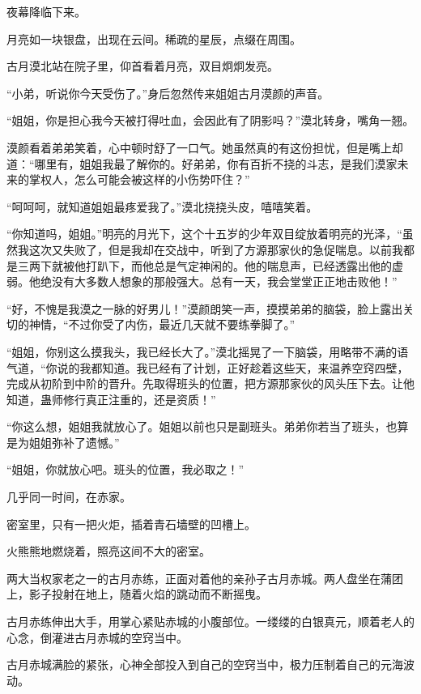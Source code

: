 
\begin{this_body}

夜幕降临下来。

月亮如一块银盘，出现在云间。稀疏的星辰，点缀在周围。

古月漠北站在院子里，仰首看着月亮，双目炯炯发亮。

“小弟，听说你今天受伤了。”身后忽然传来姐姐古月漠颜的声音。

“姐姐，你是担心我今天被打得吐血，会因此有了阴影吗？”漠北转身，嘴角一翘。

漠颜看着弟弟笑着，心中顿时舒了一口气。她虽然真的有这份担忧，但是嘴上却道：“哪里有，姐姐我最了解你的。好弟弟，你有百折不挠的斗志，是我们漠家未来的掌权人，怎么可能会被这样的小伤势吓住？”

“呵呵呵，就知道姐姐最疼爱我了。”漠北挠挠头皮，嘻嘻笑着。

“你知道吗，姐姐。”明亮的月光下，这个十五岁的少年双目绽放着明亮的光泽，“虽然我这次又失败了，但是我却在交战中，听到了方源那家伙的急促喘息。以前我都是三两下就被他打趴下，而他总是气定神闲的。他的喘息声，已经透露出他的虚弱。他绝没有大多数人想象的那般强大。总有一天，我会堂堂正正地击败他！”

“好，不愧是我漠之一脉的好男儿！”漠颜朗笑一声，摸摸弟弟的脑袋，脸上露出关切的神情，“不过你受了内伤，最近几天就不要练拳脚了。”

“姐姐，你别这么摸我头，我已经长大了。”漠北摇晃了一下脑袋，用略带不满的语气道，“你说的我都知道。我已经有了计划，正好趁着这些天，来温养空窍四壁，完成从初阶到中阶的晋升。先取得班头的位置，把方源那家伙的风头压下去。让他知道，蛊师修行真正注重的，还是资质！”

“你这么想，姐姐我就放心了。姐姐以前也只是副班头。弟弟你若当了班头，也算是为姐姐弥补了遗憾。”

“姐姐，你就放心吧。班头的位置，我必取之！”

几乎同一时间，在赤家。

密室里，只有一把火炬，插着青石墙壁的凹槽上。

火熊熊地燃烧着，照亮这间不大的密室。

两大当权家老之一的古月赤练，正面对着他的亲孙子古月赤城。两人盘坐在蒲团上，影子投射在地上，随着火焰的跳动而不断摇曳。

古月赤练伸出大手，用掌心紧贴赤城的小腹部位。一缕缕的白银真元，顺着老人的心念，倒灌进古月赤城的空窍当中。

古月赤城满脸的紧张，心神全部投入到自己的空窍当中，极力压制着自己的元海波动。


\end{this_body}
